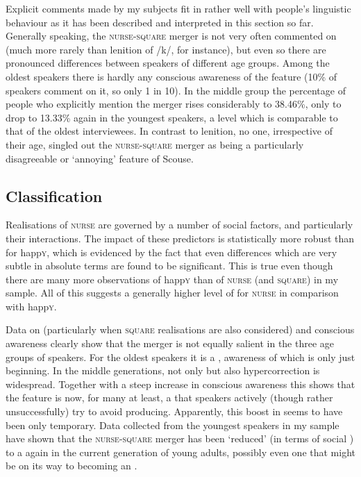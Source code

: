 Explicit comments made by my subjects fit in rather well with people's linguistic behaviour as it has been described and interpreted in this section so far.
Generally speaking, the \textsc{nurse}-\textsc{square} merger is not very often commented on (much more rarely than lenition of /k/, for instance), but even so there are pronounced differences between speakers of different age groups.
Among the oldest speakers there is hardly any conscious awareness of the feature (10\% of speakers comment on it, so only 1 in 10).
In the middle group the percentage of people who explicitly mention the merger rises considerably to 38.46\%, only to drop to 13.33\% again in the youngest speakers, a level which is comparable to that of the oldest interviewees.
In contrast to lenition, no one, irrespective of their age, singled out the \textsc{nurse}-\textsc{square} merger as being a particularly disagreeable or `annoying' feature of Scouse.

\subsection{Classification}

Realisations of \textsc{nurse} are governed by a number of social factors, and particularly their interactions.
The impact of these predictors is statistically more robust than for happ\textsc{y}, which is evidenced by the fact that even differences which are very subtle in absolute terms are found to be significant.
This is true even though there are many more observations of happ\textsc{y} than of \textsc{nurse} (and \textsc{square}) in my sample.
All of this suggests a generally higher level of  for \textsc{nurse} in comparison with happ\textsc{y}.

Data on  (particularly when \textsc{square} realisations are also considered) and conscious awareness clearly show that the merger is not equally salient in the three age groups of speakers.
For the oldest speakers it is a , awareness of which is only just beginning.
In the middle generations, not only  but also hypercorrection is widespread.
Together with a steep increase in conscious awareness this shows that the feature is now, for many at least, a  that speakers actively (though rather unsuccessfully) try to avoid producing.
Apparently, this boost in  seems to have been only temporary.
Data collected from the youngest speakers in my sample have shown that the \textsc{nurse}-\textsc{square} merger has been `reduced' (in terms of social ) to a  again in the current generation of young adults, possibly even one that might be on its way to becoming an .

